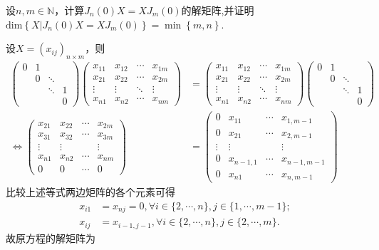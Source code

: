 \documentclass[../../main.tex]{subfiles}%
\begin{document}
\begin{proposition}\label{proposition:与J_n(0)可交换的的矩阵}
设$n,m\in\mathbb{N}$，计算$J_n(0)X = XJ_m(0)$的解矩阵,并证明$\mathrm{dim}\left\{ X|J_n\left( 0 \right) X=XJ_m\left( 0 \right) \right\} =\min \left\{ m,n \right\}$.
\end{proposition}
\begin{solution}

设$X=(x_{ij})_{n\times m}$，则
\begin{align*}
\begin{pmatrix}
0 & 1 &  &  \\
 & 0 & \ddots &  \\
 &  & \ddots & 1 \\
 &  &  & 0
\end{pmatrix}
\begin{pmatrix}
x_{11} & x_{12} & \cdots & x_{1m} \\
x_{21} & x_{22} & \cdots & x_{2m} \\
\vdots & \vdots & \ddots & \vdots \\
x_{n1} & x_{n2} & \cdots & x_{nm}
\end{pmatrix}
&=
\begin{pmatrix}
x_{11} & x_{12} & \cdots & x_{1m} \\
x_{21} & x_{22} & \cdots & x_{2m} \\
\vdots & \vdots & \ddots & \vdots \\
x_{n1} & x_{n2} & \cdots & x_{nm}
\end{pmatrix}
\begin{pmatrix}
0 & 1 &  &  \\
 & 0 & \ddots &  \\
 &  & \ddots & 1 \\
 &  &  & 0
\end{pmatrix} \\
\Longleftrightarrow
\begin{pmatrix}
x_{21} & x_{22} & \cdots & x_{2m} \\
x_{31} & x_{32} & \cdots & x_{3m} \\
\vdots & \vdots &  & \vdots \\
x_{n1} & x_{n2} & \cdots & x_{nm} \\
0 & 0 & \cdots & 0
\end{pmatrix}
&=
\begin{pmatrix}
0 & x_{11} & \cdots & x_{1,m - 1} \\
0 & x_{21} & \cdots & x_{2,m - 1} \\
\vdots & \vdots &  & \vdots \\
0 & x_{n - 1,1} & \cdots & x_{n - 1,m - 1} \\
0 & x_{n1} & \cdots & x_{n,m - 1}
\end{pmatrix}
\end{align*}
比较上述等式两边矩阵的各个元素可得
\begin{align*}
x_{i1}&=x_{nj}=0, \forall i\in\{2,\cdots,n\}, j\in\{1,\cdots,m - 1\}; \\
x_{ij}&=x_{i - 1,j - 1}, \forall i\in\{2,\cdots,n\}, j\in\{2,\cdots,m\}.
\end{align*}
故原方程的解矩阵为


\end{solution}
\end{document}
